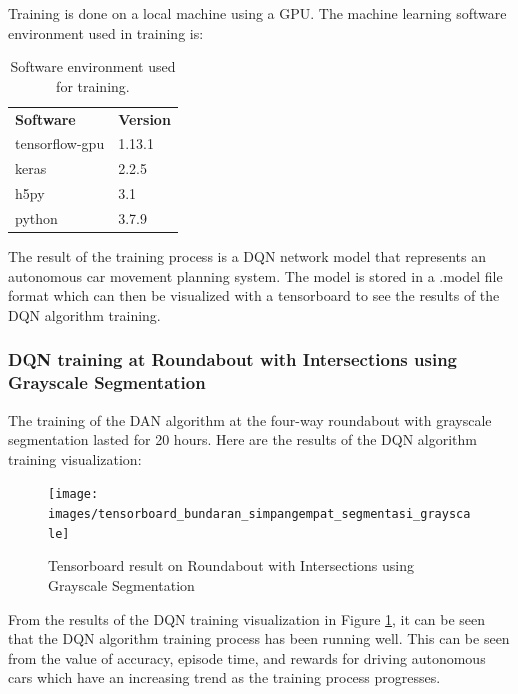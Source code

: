 \documentclass[conference]{IEEEtran}
\begin{document}
	Training is done on a local machine using a GPU. The machine learning software environment used in training is:
	
	\begin{table}[H]
		\begin{tabular}{ll}
			\textbf{Software}  & \textbf{Version}              \\
			tensorflow-gpu  & 1.13.1	\\
			keras  & 2.2.5					\\
			h5py & 3.1              \\
			python & 3.7.9              \\
		\end{tabular}
		\caption{Software environment used for training.}
		\label{tb:softwaresetup}
	\end{table}
	
	
	The result of the training process is a DQN network model that represents an autonomous car movement planning system. The model is stored in a .model file format which can then be visualized with a tensorboard to see the results of the DQN algorithm training.
	
	\subsubsection{DQN training at Roundabout with Intersections using Grayscale Segmentation}
	\label{sec:training_dqn_bundaran_simpangempat_segmentasi_grayscale}
	
	The training of the DAN algorithm at the four-way roundabout with grayscale segmentation lasted for 20 hours. Here are the results of the DQN algorithm training visualization:
	
	\begin{figure}[H] 
		\centering
		\texttt{[image: images/tensorboard\_bundaran\_simpangempat\_segmentasi\_grayscale]}
		\caption{Tensorboard result on Roundabout with Intersections using Grayscale Segmentation}
		\label{fig:tensorboard_bundaran_simpangempat_segmentasi_grayscale}
	\end{figure}
	
	From the results of the DQN training visualization in Figure  \ref{fig:tensorboard_bundaran_simpangempat_segmentasi_grayscale}, it can be seen that the DQN algorithm training process has been running well. This can be seen from the value of accuracy, episode time, and rewards for driving autonomous cars which have an increasing trend as the training process progresses.
	
\end{document}
